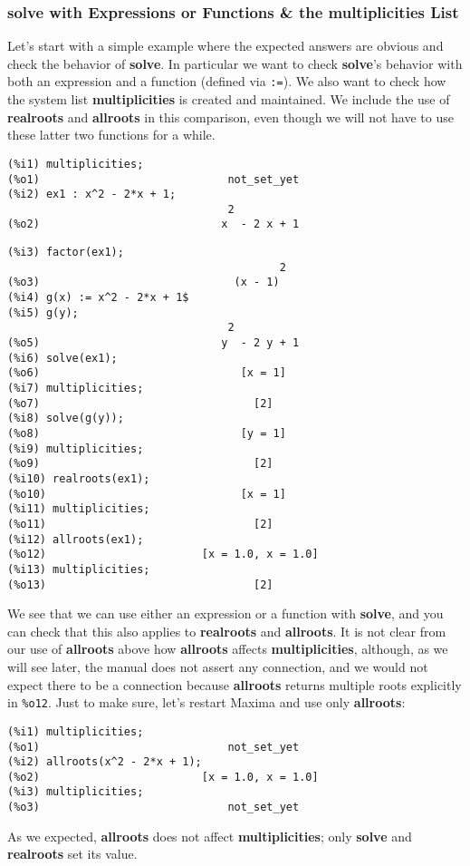 \documentclass[12pt]{article}
\begin{document}
\subsubsection{solve with Expressions or Functions \& the multiplicities List}
Let's start with a simple example where the expected answers are obvious and
  check the behavior of \textbf{solve}.
In particular we want to check \textbf{solve}'s behavior with both an expression
  and a function (defined via \verb|:=|).
We also want to check how the system list \textbf{multiplicities} is created
  and maintained.
We include the use of \textbf{realroots} and \textbf{allroots} in this comparison,
  even though we will not have to use these latter two functions for a while.
 \small
 \begin{verbatim}
(%i1) multiplicities;
(%o1)                             not_set_yet
(%i2) ex1 : x^2 - 2*x + 1;
                                  2
(%o2)                            x  - 2 x + 1
\end{verbatim}
\newpage
\begin{verbatim}
(%i3) factor(ex1);
                                          2
(%o3)                              (x - 1)
(%i4) g(x) := x^2 - 2*x + 1$
(%i5) g(y);
                                  2
(%o5)                            y  - 2 y + 1
(%i6) solve(ex1);
(%o6)                               [x = 1]
(%i7) multiplicities;
(%o7)                                 [2]
(%i8) solve(g(y));
(%o8)                               [y = 1]
(%i9) multiplicities;
(%o9)                                 [2]
(%i10) realroots(ex1);
(%o10)                              [x = 1]
(%i11) multiplicities;
(%o11)                                [2]
(%i12) allroots(ex1);
(%o12)                        [x = 1.0, x = 1.0]
(%i13) multiplicities;
(%o13)                                [2]
\end{verbatim}
\normalsize
We see that we can use either an expression or a function with \textbf{solve}, and you can 
  check that this also applies to \textbf{realroots} and \textbf{allroots}.
It is not clear from our use of \textbf{allroots} above how \textbf{allroots} affects
  \textbf{multiplicities}, although, as we will see later, the manual does not assert
  any connection, and we would not expect there to be a connection because \textbf{allroots}
  returns multiple roots explicitly in \verb|%o12|.
Just to make sure, let's restart Maxima and use only \textbf{allroots}:
\small
\begin{verbatim}
(%i1) multiplicities;
(%o1)                             not_set_yet
(%i2) allroots(x^2 - 2*x + 1);
(%o2)                         [x = 1.0, x = 1.0]
(%i3) multiplicities;
(%o3)                             not_set_yet
 \end{verbatim}
 \normalsize
As we expected, \textbf{allroots} does not affect \textbf{multiplicities}; only \textbf{solve}
  and \textbf{realroots} set its value. 
\end{document}
